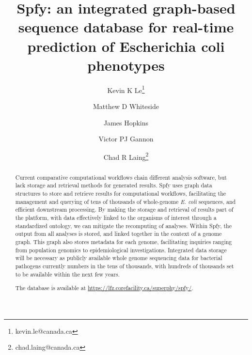 \documentclass{article}
\begin{document}
\title{Spfy: an integrated graph-based sequence database for real-time prediction of Escherichia coli phenotypes}

\author[1]{Kevin K Le\thanks{kevin.le@canada.ca}}
\author[1]{Matthew D Whiteside}
\author[1]{James Hopkins}
\author[1]{Victor PJ Gannon}
\author[1]{Chad R Laing\thanks{chad.laing@canada.ca}}

\renewcommand\Authands{ and }

\maketitle

\begin{abstract}

Current comparative computational workflows chain different analysis software, but lack storage and retrieval methods for generated results.
Spfy uses graph data structures to store and retrieve results for computational workflows, facilitating the management and querying of tens of thousands of whole-genome \textit{E. coli} sequences, and efficient downstream processing.
By making the storage and retrieval of results part of the platform, with data effectively linked to the organisms of interest through a standardized ontology, we can mitigate the recomputing of analyses.
Within Spfy, the output from all analyses is stored, and linked together in the context of a genome graph. This graph also stores metadata for each genome, facilitating inquiries ranging from population genomics to epidemiological investigations.
Integrated data storage will be necessary as publicly available whole genome sequencing data for bacterial pathogens currently numbers in the tens of thousands, with hundreds of thousands set to be available within the next few years. \par

The database is available at \url{https://lfz.corefacility.ca/superphy/spfy/}.

\end{abstract}
\end{document}
